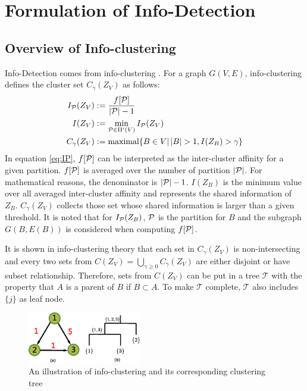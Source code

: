 \documentclass[runningheads]{llncs}
\begin{document}
\section{Formulation of Info-Detection}\label{sec:ID}
\subsection{Overview of Info-clustering}
Info-Detection comes from info-clustering \cite{RN1}. For a graph $G(V,E)$, info-clustering defines the cluster set $C_{\gamma}(Z_V)$ as follows:
\begin{align}
I_{\P}(Z_V) & := \frac{ f[\P] }{  \abs{\mathcal{P}} - 1 } \label{eq:IP}\\
I(Z_V) & := \min_{\mathcal{P} \in \Pi'(V)} I_{\mathcal{P}}(Z_V)  \label{eq:ms} \\
C_{\gamma}(Z_V) & := \textrm{maximal}\{ B \in V \vert \, \abs{B} > 1, I(Z_B) > \gamma \} \label{eq:CgZv}
\end{align}
In equation \eqref{eq:IP}, $f[\P]$ can be interpreted as the inter-cluster affinity for a given partition. $f[\P]$ is averaged over the number of partition $\abs{\P}$. For mathematical reasons, the denominator is $\abs{\P}-1$. $I(Z_B)$ is the minimum value over all averaged inter-cluster affinity and represents the shared information of $Z_B$. $C_{\gamma}(Z_V)$ collects those set whose shared information is larger than a given threshold. It is noted that for $I_{\P}(Z_B)$, $\P$ is the partition for $B$ and the subgraph $G(B,E(B))$ is considered when computing $f[\P]$.

It is shown in info-clustering theory that each set in $C_{\gamma} (Z_V)$ is non-intersecting and every two sets from $C(Z_V)=\bigcup_{\gamma \geq 0} C_{\gamma}(Z_V)$ are either disjoint or have subset relationship. Therefore, sets from $C(Z_V)$ can be put in a tree $\mathcal{T}$ with the property that $A$ is a parent of $B$ if $B\subset A$. To make $\mathcal{T}$ complete, $\mathcal{T}$ also includes $\{j\}$ as leaf node. 

\begin{figure}
	\begin{center}
		\includegraphics[width=0.44\textwidth]{pic/example_directed.eps}
	\end{center}
	\caption{An illustration of info-clustering and its corresponding clustering tree}\label{fig:first_illustration}
\end{figure}
\end{document}
